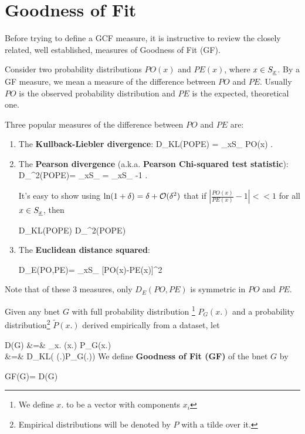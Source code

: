 \documentclass[12pt]{article}
\newcommand{\tilP}[0]{\tilde{P}}
\begin{document}
\section{Goodness of Fit}
Before trying to
define a GCF measure,
it
is instructive to review 
the closely related, well established, measures
of Goodness of Fit (GF). 



Consider 
two
probability distributions
$PO(x)$ and $PE(x)$,
where $x\in S_{\underline{x}}$.
By a GF measure, we mean 
a measure of the 
difference between 
$PO$ and $PE$.
Usually $PO$ is the
observed probability distribution and 
$PE$ is the expected, theoretical one.


Three popular
measures of
the difference between $PO$ and $PE$
are:
\begin{enumerate}
\item
The
{\bf Kullback-Liebler divergence}:
\beq
D_{KL}(PO\parallel PE) =
\sum_{x\in S_\rvx}
PO(x)\ln {}
\;.
\eeq
\item
The
{\bf Pearson divergence}
(a.k.a. {\bf Pearson Chi-squared test statistic}):
\beq
D_{\chi^2}(PO\parallel PE)=
\sum_{x\in S_\rvx}
=
\sum_{x\in S_\rvx}
-1
\;.
\eeq

It's easy to show 
using $\ln(1+\delta)=\delta +{\cal O}(\delta^2)$
that
if $\left|\frac{PO(x)}{PE(x)}-1\right|<<1$
for all $x\in S_{\underline{x}}$, then

\beq
D_{KL}(PO\parallel PE)\approx 
D_{\chi^2}(PO\parallel PE)
\eeq

\item
The {\bf Euclidean distance squared}:

\beq
D_E(PO,PE)=
\sum_{x\in S_\rvx}
[PO(x)-PE(x)]^2
\eeq
\end{enumerate}
Note that of these 3 measures,
only $D_E(PO, PE)$ is symmetric 
in $PO$ and $PE$.


Given any bnet $G$
with full probability
distribution
\footnote{We define
$x.$
to be a vector
with components $x_i$}
  $P_G(x.)$
and a
probability distribution\footnote{
Empirical distributions will 
be denoted by $P$ with a tilde over it.}
$\tilP(x.)$
derived empirically from a dataset,
let

\beqa
D(G)
&=&
\sum_{x.}
\tilP(x.)\ln 
\frac{\tilP(x.)}
{P_{G}(x.)}
\\
&=&
D_{KL}(
\tilP(\rvx.)\parallel P_{G}(\rvx.))
\eeqa
We define {\bf Goodness of Fit (GF)}
of the bnet $G$ by

\beq
GF(G)=\ln {}
{D(G)}
\eeq
\end{document}
